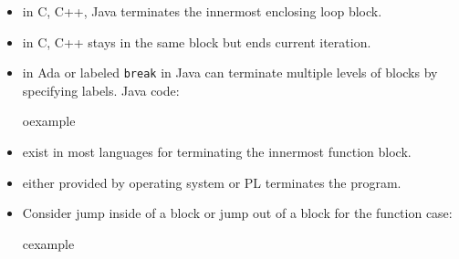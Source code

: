 \begin{frame}
\begin{itemize}
\item {} in C, C++, Java terminates the innermost
	enclosing loop block.
\item {} in C, C++ stays in the same block but ends current iteration.
\item {} in Ada or labeled \texttt{break} in Java can terminate
multiple levels of blocks by specifying labels. Java code:\\
\begin{beamercolorbox}{oexample}
\codejavaescapes
\end{beamercolorbox}
\end{itemize}
\end{frame}

\begin{frame}
\begin{itemize}
\item {} exist in most languages for terminating the innermost
function block.
\item {} either provided by operating system or PL terminates the
program.
\item Consider jump inside of a block or jump out of a block for the function case:
\begin{beamercolorbox}{cexample}
\codejumpfunc
\end{beamercolorbox}
\end{itemize}
\end{frame}

